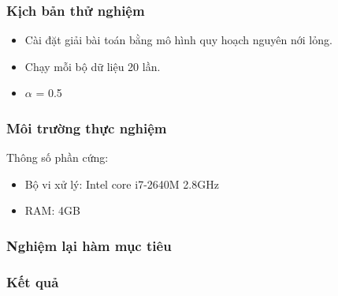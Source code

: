 \begin{frame}
    \frametitle{Kịch bản thử nghiệm}
    
    \begin{itemize}
        \item Cài đặt giải bài toán bằng mô hình quy hoạch nguyên nới lỏng.
        \item Chạy mỗi bộ dữ liệu 20 lần.
        \item $\alpha$ = 0.5
    \end{itemize}
\end{frame}

\begin{frame}
    \frametitle{Môi trường thực nghiệm}
    Thông số phần cứng:
    \begin{itemize}
        \item Bộ vi xử lý: Intel core i7-2640M 2.8GHz
        \item RAM: 4GB    
    \end{itemize}
\end{frame}

\begin{frame}
    \frametitle{Nghiệm lại hàm mục tiêu}
\end{frame}

\begin{frame}
    \frametitle{Kết quả}
\end{frame}